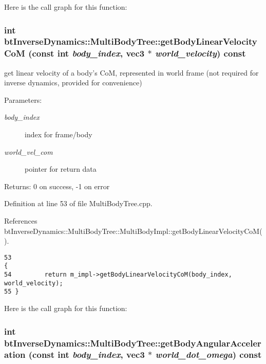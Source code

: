 Here is the call graph for this function:\hypertarget{classbt_inverse_dynamics_1_1_multi_body_tree_0e3e87b9f2531a8771fa7193449ca26d}{
\subsubsection[getBodyLinearVelocityCoM]{\setlength{\rightskip}{0pt plus 5cm}int btInverseDynamics::MultiBodyTree::getBodyLinearVelocityCoM (const int {\em body\_\-index}, \/  {\bf vec3} $\ast$ {\em world\_\-velocity}) const}}
\label{classbt_inverse_dynamics_1_1_multi_body_tree_0e3e87b9f2531a8771fa7193449ca26d}


get linear velocity of a body's CoM, represented in world frame (not required for inverse dynamics, provided for convenience) \begin{Desc}
\item[Parameters:]
\begin{description}
\item[{\em body\_\-index}]index for frame/body \item[{\em world\_\-vel\_\-com}]pointer for return data \end{description}
\end{Desc}
\begin{Desc}
\item[Returns:]0 on success, -1 on error \end{Desc}


Definition at line 53 of file MultiBodyTree.cpp.

References btInverseDynamics::MultiBodyTree::MultiBodyImpl::getBodyLinearVelocityCoM().

\begin{Code}\begin{verbatim}53                                                                                             {
54         return m_impl->getBodyLinearVelocityCoM(body_index, world_velocity);
55 }
\end{verbatim}
\end{Code}




Here is the call graph for this function:\hypertarget{classbt_inverse_dynamics_1_1_multi_body_tree_1f216eaec9b229133a1a59ac0b415d13}{
\subsubsection[getBodyAngularAcceleration]{\setlength{\rightskip}{0pt plus 5cm}int btInverseDynamics::MultiBodyTree::getBodyAngularAcceleration (const int {\em body\_\-index}, \/  {\bf vec3} $\ast$ {\em world\_\-dot\_\-omega}) const}}
\label{classbt_inverse_dynamics_1_1_multi_body_tree_1f216eaec9b229133a1a59ac0b415d13}


